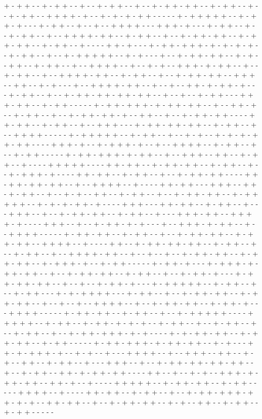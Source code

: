 + - + + - - + - + + - - + - - + - + + - - + - - + - + + - + + - - + - + + - - + - - + - + + - - + + + + - + - - + - + - + - + + - - - - - + - + + + + + - - + - + + - + - - - + - + + - - + - - + - - + + + + - - - + + + - + - - - + - + + - - + - - + - + + - - + - - + + + + - + + - - + - + + - - + - - + - + + - + + - - + - + + - + + - - + - + + - - + - - - - + + - + - - - + - + + - + + + - + - + - + - + - - + - + + - - + - - + - + + + + + - - + - + - - - + - - + - + + - + + - - + - + - - + + - - + - + + - - + - - + + + + - - + - - + - + - - + + + - + - + + - - + - - + - + + - - + - - + + + + - + + - - + - + + - - + - - + - + + - + + - - + + + - - + + - - + - + - - - + - - + + + + - + + - - + - - + - - + + - + - + + - + - - - + - + + - - + - - + - + + - + + - + + - + + - - + - - + - - + - + + - - - + + + - + + - - + - + + - - - - - + - + + - + + + - + - + + - + + - - + - - + + - + - - + - + + - - + - - + - + + - + + - + - - + + - - + - - + - + + - + + - - - - + + - + + - - + - + + - - + - - + + + - - - + - + + - + + - + + - - + - + + - - + - - + + + + - - - - - + - + + + + + - - + - + + - - + - - + - + - - + - + - + - + + - + + - - - - + + + - + - - + - + + + - + - - + - - + + + + - - + - + + - - + - - + - + + - - - - - + - + + - + + + - + - + + - - + - - + + + - - + + - - + - + + - - + - - - - + + + + + - - - - + + - + + - - + - + + - + + - - + - + + - - + - - + - + + + - + - - - - + + - + + - - + - + + - - + - - + - + + - + + - - - - + + - + + - + + - + + - - + - - + + + + - - + - - - - + + - + + - - - + + + - - + + - + - + + - - + - - + - + - - + + - - + - + + - - + - - + - + + - + + - - + - + + + + + - - + - + - + - + + - + - - - - + + + - - - + + - + + - - + - + + - - + - - - + + + - - + - - + - + + - + + - - + - + + - - + - - - + + + - + + - - + + + + - + - - - - + + + - - + - - + - + + - + - + - - - + - - + + + - + - + + - - + - - + + + + - - - - - + - + + - + + - - + - + + - - + - - + - + + - + + - - + - + + - + + - - + + + + - - + - - - - + + - - + - + + - + + - + + - - + - + + - - + - - + - + + - - + - - + + + + - + + - - + - - + - - + - - + - + + - + + - - + - + + - + + - - + - + + + - + - - + - + + - - - - - + - + + - + - - - + - + + + - + - + + - + + - - + - - + - + + - + + - - + - + + - - + - - + - + + - + - - - + - + + - + + - + + - - + - - + - - + - + + - + - - - + - + + + + + - - + - + + - - + - - + - + + - - - + - + - + + + + - - - + - + + - - + - - + - + + - + + - - + - + + - + + - - + - - + - - + - - + + + + - - + - - + - + + - + + - - + - + + - + - - - + + + + - - - - - + - + + - + + - - + - + + - - + - - + - + + + + + - - - - + + + + + - - + - + + - - + - + + - + - + - + - - + - + + - - + - - + - + + - - + - - + - + + - - + - - + - + + - + + + - + - + - - - - + - + - + + - + + - - + - + + - + + - - + - + + - - - - - + - + + - + + + - + - + + - + + - - + - + - - - + + - + - + + + - + - - + - + - - + - - - + + + + - - + - - + + + - - + + - - + - + - - + + - - + - + + - - + - - - + + + - - + - - + - + + - + + - + + - + + - - + - - + - + + - - + + - + - + + - + + - - - - + + - - + - - + - + - - + + + - + - + + - + + - - + + - + - - + - - - - + + + + + - - + - + + - + + - - + - + + - - - - - + + + + - - + - - - - + + - + + - - + - + + - - + - - + - + + - + + + - + + - + - + - - + + - + + - - + - - + - + + - + + - - + - + - - + + - - + - + + - - + - + + - - - - - 